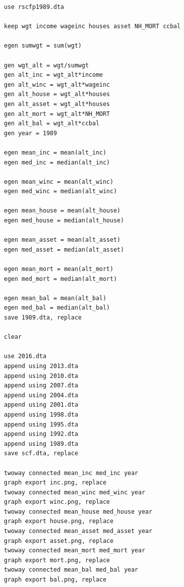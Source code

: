 \documentclass[12pt, letterpaper, parskip = full]{article}
\begin{document}
\begin{lstlisting}[breaklines]
use rscfp1989.dta

keep wgt income wageinc houses asset NH_MORT ccbal

egen sumwgt = sum(wgt)

gen wgt_alt = wgt/sumwgt
gen alt_inc = wgt_alt*income
gen alt_winc = wgt_alt*wageinc
gen alt_house = wgt_alt*houses
gen alt_asset = wgt_alt*houses
gen alt_mort = wgt_alt*NH_MORT
gen alt_bal = wgt_alt*ccbal
gen year = 1989

egen mean_inc = mean(alt_inc)
egen med_inc = median(alt_inc)

egen mean_winc = mean(alt_winc)
egen med_winc = median(alt_winc)

egen mean_house = mean(alt_house)
egen med_house = median(alt_house)

egen mean_asset = mean(alt_asset)
egen med_asset = median(alt_asset)

egen mean_mort = mean(alt_mort)
egen med_mort = median(alt_mort)

egen mean_bal = mean(alt_bal)
egen med_bal = median(alt_bal)
save 1989.dta, replace

clear

use 2016.dta
append using 2013.dta
append using 2010.dta
append using 2007.dta
append using 2004.dta
append using 2001.dta
append using 1998.dta
append using 1995.dta
append using 1992.dta
append using 1989.dta
save scf.dta, replace

twoway connected mean_inc med_inc year
graph export inc.png, replace
twoway connected mean_winc med_winc year
graph export winc.png, replace
twoway connected mean_house med_house year
graph export house.png, replace
twoway connected mean_asset med_asset year
graph export asset.png, replace
twoway connected mean_mort med_mort year
graph export mort.png, replace
twoway connected mean_bal med_bal year
graph export bal.png, replace
\end{lstlisting}
\end{document}
